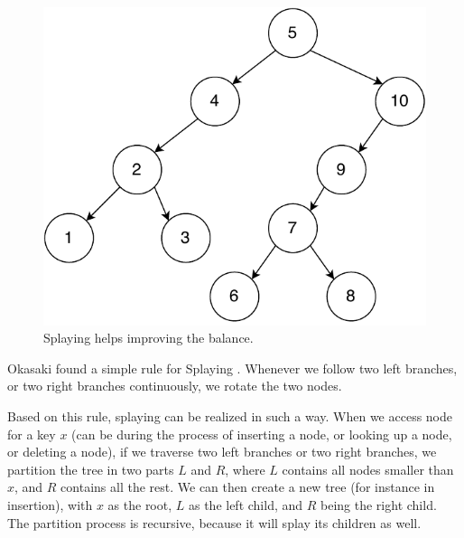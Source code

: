 \documentclass[b5paper]{article}
\begin{document}
\begin{figure}[htbp]
  \centering
  \includegraphics[scale=0.5]{img/splay-tree}
  \caption{Splaying helps improving the balance.}
  \label{fig:splay-result}
\end{figure}

Okasaki found a simple rule for Splaying \cite{okasaki-book}.
Whenever we follow
two left branches, or two right branches continuously, we rotate
the two nodes.

Based on this rule, splaying can be realized in such a way.
When we access node for a key $x$ (can be during the process of
inserting a node, or looking up a node, or deleting a node), if
we traverse two left branches or two right branches, we
partition the tree in two parts $L$ and $R$, where $L$ contains all
nodes smaller than $x$, and $R$ contains all the rest.
We can then create a new tree (for instance in insertion),
with $x$ as the root, $L$ as the left child, and $R$ being the right child.
The partition process is recursive, because it will splay
its children as well.
\end{document}
